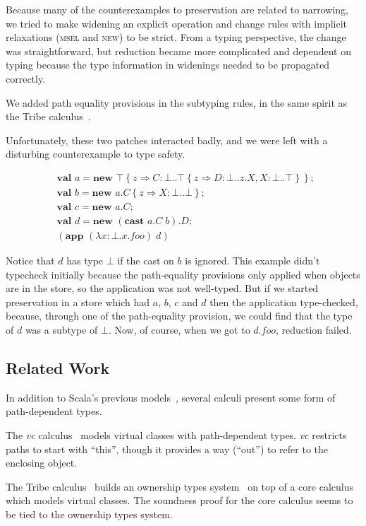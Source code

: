 \documentclass[9pt]{sigplanconf}
\newcommand{\refine}[2]{\left\{#1 \Rightarrow #2 \right\}}
\newcommand{\abs}[3]{\lambda #1\!:\!#2.#3}
\newcommand{\mlnew}[3]{\textbf{val }#1 = \textbf{new }#2 ;\;\\&#3}
\newcommand{\Ldecl}[3]{#1 : #2..#3}%
\newcommand{\Top}{\top}%
\newcommand{\Bot}{\bot}%
\newcommand{\app}[2]{(\textbf{app }#1\;#2)}
\newcommand{\cast}[2]{(\textbf{cast }#1\;#2)}
\begin{document}
Because many of the counterexamples to preservation are related to
narrowing, we tried to make widening an explicit operation and change
rules with implicit relaxations (\textsc{msel} and \textsc{new}) to be
strict. From a typing perspective, the change was straightforward, but
reduction became more complicated and dependent on typing because the
type information in widenings needed to be propagated correctly.

We added path equality provisions in the subtyping rules, in the same
spirit as the Tribe calculus~\cite{tribe}.

Unfortunately, these two patches interacted badly, and we were left
with a disturbing counterexample to type safety.

\begin{align*}
&\mlnew a {\Top \refine z {\Ldecl C \Bot {\Top \refine z {\Ldecl D \Bot {z.X}, \Ldecl X \Bot \Top}}}}{
\mlnew b {{a.C} \refine z {\Ldecl X \Bot \Bot}}}{
\mlnew c {a.C}}{
\mlnew d {{\cast {a.C} b}.D}}{
\app {(\abs x \Bot {x.\mathit{foo}})} d
}
\end{align*}

Notice that $d$ has type $\Bot$ if the cast on $b$ is ignored. This
example didn't typecheck initially because the path-equality
provisions only applied when objects are in the store, so the
application was not well-typed. But if we started preservation in a store
which had $a$, $b$, $c$ and $d$ then the application type-checked,
because, through one of the path-equality provision, we could find that
the type of $d$ was a subtype of $\Bot$. Now, of course, when we got to
$d.\mathit{foo}$, reduction failed.

\subsection{Related Work}

In addition to Scala's previous models~\cite{nuObj,FS}, several
calculi present some form of path-dependent types.

The {\it vc} calculus~\cite{vc} models virtual classes with
path-dependent types. {\it vc} restricts paths to start with ``this'',
though it provides a way (``out'') to refer to the enclosing object.

The Tribe calculus~\cite{tribe} builds an ownership types
system~\cite{tribalo} on top of a core calculus which models virtual
classes. The soundness proof for the core calculus seems to be tied to
the ownership types system.
\end{document}
